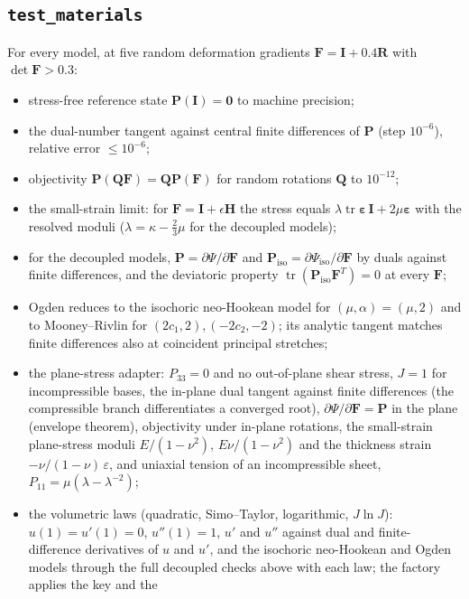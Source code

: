 \documentclass[11pt]{article}
\newcommand{\tr}{\operatorname{tr}}
\newcommand{\bP}{\bm{P}}
\newcommand{\bF}{\bm{F}}
\newcommand{\bI}{\bm{I}}
\newcommand{\bR}{\bm{R}}
\begin{document}
\subsection{\texttt{test\_materials}}
For every model, at five random deformation gradients $\bF = \bI + 0.4\bR$
with $\det\bF > 0.3$:
\begin{itemize}[nosep]
  \item stress-free reference state $\bP(\bI) = \bm 0$ to machine precision;
  \item the dual-number tangent against central finite differences of
    $\bP$ (step $10^{-6}$), relative error $\le 10^{-6}$;
  \item objectivity $\bP(\bm Q\bF) = \bm Q\bP(\bF)$ for random rotations
    $\bm Q$ to $10^{-12}$;
  \item the small-strain limit: for $\bF = \bI + \epsilon\bm H$ the stress
    equals $\lambda\tr\bm\varepsilon\,\bI + 2\mu\bm\varepsilon$ with the
    resolved moduli ($\lambda = \kappa - \tfrac23\mu$ for the decoupled
    models);
  \item for the decoupled models, $\bP = \partial\Psi/\partial\bF$ and
    $\bP_{\mathrm{iso}} = \partial\Psi_{\mathrm{iso}}/\partial\bF$ by
    duals against finite differences, and the deviatoric property
    $\tr(\bP_{\mathrm{iso}}\bF^T) = 0$ at every $\bF$;
  \item Ogden reduces to the isochoric neo-Hookean model for
    $(\mu, \alpha) = (\mu, 2)$ and to Mooney--Rivlin for
    $(2c_1, 2), (-2c_2, -2)$; its analytic tangent matches finite
    differences also at coincident principal stretches;
  \item the plane-stress adapter: $P_{33} = 0$ and no out-of-plane shear
    stress, $J = 1$ for incompressible bases, the in-plane dual tangent
    against finite differences (the compressible branch differentiates a
    converged root), $\partial\Psi/\partial\bF = \bP$ in the plane
    (envelope theorem), objectivity under in-plane rotations, the
    small-strain plane-stress moduli $E/(1-\nu^2)$, $E\nu/(1-\nu^2)$ and
    the thickness strain $-\nu/(1-\nu)\,\varepsilon$, and uniaxial tension
    of an incompressible sheet, $P_{11} = \mu(\lambda - \lambda^{-2})$;
  \item the volumetric laws (quadratic, Simo--Taylor, logarithmic,
    $J\ln J$): $u(1) = u'(1) = 0$, $u''(1) = 1$, $u'$ and $u''$ against
    dual and finite-difference derivatives of $u$ and $u'$, and the
    isochoric neo-Hookean and Ogden models through the full decoupled
    checks above with each law; the factory applies the key and the

\end{itemize}
\end{document}
